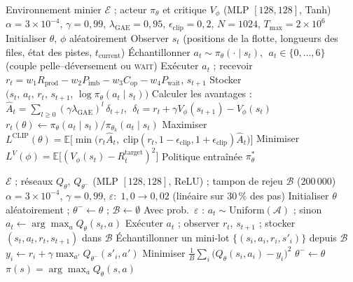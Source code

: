 \documentclass[11pt,a4paper]{article}
\begin{document}
\begin{algorithm}[H]
\caption{PPO pour le dispatching de camions miniers}
\label{alg:ppo}
\begin{algorithmic}[1]
\Require Environnement minier $\mathcal{E}$ ; acteur $\pi_\theta$ et critique $V_\phi$ (MLP $[128,128]$, Tanh)
\Require $\alpha{=}3{\times}10^{-4}$, $\gamma{=}0{,}99$, $\lambda_{\text{GAE}}{=}0{,}95$, $\epsilon_{\text{clip}}{=}0{,}2$, $N{=}1024$, $T_{\max}{=}2{\times}10^6$
\State Initialiser $\theta$, $\phi$ aléatoirement
   
    \State Observer $s_t$ (positions de la flotte, longueurs des files, état des pistes, $t_{\text{current}}$)
    \State Échantillonner $a_t \sim \pi_\theta(\cdot\mid s_t)$, $\;a_t\in\{0,\ldots,6\}$ (couple pelle--déversement ou \textsc{wait})
    \State Exécuter $a_t$ ; recevoir $r_t = w_1 R_{\text{prod}} - w_2 P_{\text{imb}} - w_3 C_{\text{op}} - w_4 P_{\text{wait}}$, $s_{t+1}$
    \State Stocker $\bigl(s_t,\,a_t,\,r_t,\,s_{t+1},\,\log\pi_\theta(a_t\mid s_t)\bigr)$
  \EndFor
  \State Calculer les avantages : $\hat{A}_t = \sum_{l\geq 0}(\gamma\lambda_{\text{GAE}})^l\,\delta_{t+l}$,
         $\;\delta_t = r_t + \gamma V_\phi(s_{t+1}) - V_\phi(s_t)$
    \State $r_t(\theta)\leftarrow \pi_\theta(a_t\mid s_t)/\pi_{\theta_k}(a_t\mid s_t)$
    \State Maximiser $L^{\text{CLIP}}(\theta)=\mathbb{E}\bigl[\min\bigl(r_t\hat{A}_t,\;\mathrm{clip}(r_t,1{-}\epsilon_{\text{clip}},1{+}\epsilon_{\text{clip}})\hat{A}_t\bigr)\bigr]$
    \State Minimiser $L^{V}(\phi)=\mathbb{E}\bigl[(V_\phi(s_t)-R_t^{\text{target}})^2\bigr]$
  \EndFor
\EndFor
\Ensure Politique entraînée $\pi_\theta^*$
\end{algorithmic}
\end{algorithm}

\begin{algorithm}[H]
\caption{DQN pour le dispatching de camions miniers}
\label{alg:dqn}
\begin{algorithmic}[1]
\Require $\mathcal{E}$ ; réseaux $Q_\theta$, $Q_{\theta^-}$ (MLP $[128,128]$, ReLU) ; tampon de rejeu $\mathcal{B}$ (200\,000)
\Require $\alpha{=}3{\times}10^{-4}$, $\gamma{=}0{,}99$, $\varepsilon{:}\;1{,}0\!\to\!0{,}02$ (linéaire sur $30\,\%$ des pas)
\State Initialiser $\theta$ aléatoirement ; $\theta^-\leftarrow\theta$ ; $\mathcal{B}\leftarrow\emptyset$
  \State Avec prob.\ $\varepsilon$ : $a_t\sim\text{Uniform}(\mathcal{A})$ ; sinon $a_t\leftarrow\arg\max_a Q_\theta(s_t,a)$
  \State Exécuter $a_t$ ; observer $r_t$, $s_{t+1}$ ; stocker $(s_t,a_t,r_t,s_{t+1})$ dans $\mathcal{B}$
  \State Échantillonner un mini-lot $\{(s_i,a_i,r_i,s'_i)\}$ depuis $\mathcal{B}$
  \State $y_i \leftarrow r_i + \gamma\max_{a'}Q_{\theta^-}(s'_i,a')$ 
  \State Minimiser $\frac{1}{B}\sum_i\bigl(Q_\theta(s_i,a_i)-y_i\bigr)^2$
   $\theta^-\leftarrow\theta$ \EndIf {}
\EndFor
\Ensure $\pi(s)=\arg\max_a Q_\theta(s,a)$
\end{algorithmic}
\end{algorithm}
\end{document}

